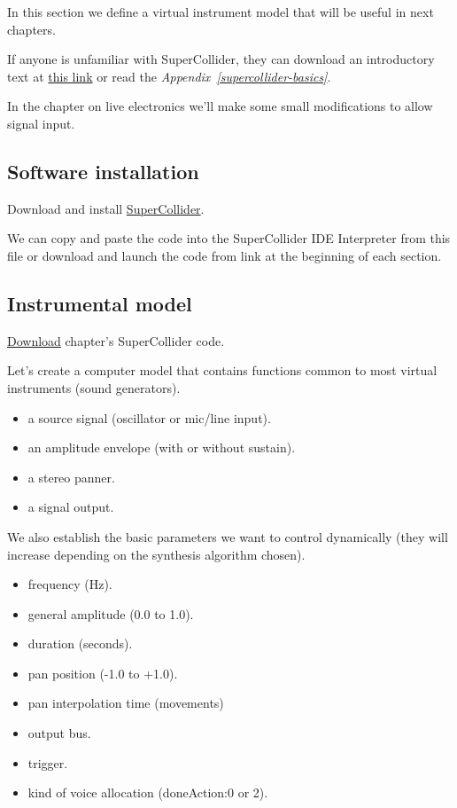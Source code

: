 In this section we define a virtual instrument model that will be useful in next chapters.

If anyone is unfamiliar with SuperCollider, they can download an introductory text at
\href{https://ccrma.stanford.edu/~ruviaro/texts/A_Gentle_Introduction_To_SuperCollider.pdf}{this link} or read the \textit{Appendix~\ref{supercollider-basics}}.

In the chapter on live electronics we'll make some small modifications to allow signal input.

\subsection{Software installation}\label{software-installation}

Download and install \href{https://supercollider.github.io/}{SuperCollider}.

We can copy and paste the code into the SuperCollider IDE Interpreter from this file or download and launch the code from link at the beginning of each section.

\subsection{Instrumental model}\label{instrumental-model}

\href{http://www.musicaecodice.it/on_server/media/code/ch_2.scd}{Download} chapter's SuperCollider code.

Let's create a computer model that contains functions common to most virtual instruments (sound generators).

\begin{itemize}
\tightlist\item a source signal (oscillator or mic/line input).
\item an amplitude envelope (with or without sustain).
\item a stereo panner.
\item a signal output.
\end{itemize}

We also establish the basic parameters we want to control dynamically (they will increase depending on the synthesis algorithm chosen).

\begin{itemize}
\tightlist\item frequency (Hz).
\item general amplitude (0.0 to 1.0).
\item duration (seconds).
\item pan position (-1.0 to +1.0).
\item pan interpolation time (movements)
\item output bus.
\item trigger.
\item kind of voice allocation (doneAction:0 or 2).
\end{itemize}

